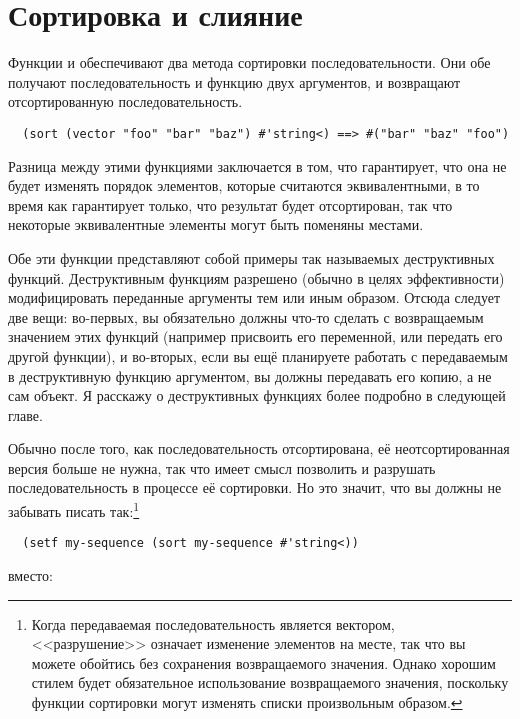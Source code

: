\section{Сортировка и слияние}

Функции  и  обеспечивают два метода сортировки
последовательности.  Они обе получают последовательность и функцию двух аргументов, и
возвращают отсортированную последовательность.

\begin{verbatim}
  (sort (vector "foo" "bar" "baz") #'string<) ==> #("bar" "baz" "foo")
\end{verbatim}

Разница между этими функциями заключается в том, что  гарантирует, что
она не будет изменять порядок элементов, которые считаются эквивалентными, в то время как
 гарантирует только, что результат будет отсортирован, так что некоторые
эквивалентные элементы могут быть поменяны местами.

Обе эти функции представляют собой примеры так называемых деструктивных функций.  Деструктивным
функциям разрешено (обычно в целях эффективности) модифицировать переданные аргументы тем
или иным образом.  Отсюда следует две вещи: во-первых, вы обязательно должны что-то сделать с
возвращаемым значением этих функций (например присвоить его переменной, или передать его
другой функции), и во-вторых, если вы ещё планируете работать с передаваемым в
деструктивную функцию аргументом, вы должны передавать его копию, а не сам объект.
Я расскажу о деструктивных функциях более подробно в следующей главе.

Обычно после того, как последовательность отсортирована, её неотсортированная версия
больше не нужна, так что имеет смысл
позволить  и  разрушать последовательность в процессе её
сортировки.  Но это значит, что вы должны не забывать писать так:\footnote{Когда
  передаваемая последовательность является вектором, <<разрушение>> означает изменение
  элементов на месте, так что вы можете обойтись без сохранения возвращаемого значения.
  Однако хорошим стилем будет обязательное использование возвращаемого значения,
  поскольку функции сортировки могут изменять списки произвольным образом.}

\begin{verbatim}
  (setf my-sequence (sort my-sequence #'string<))
\end{verbatim}

вместо:

